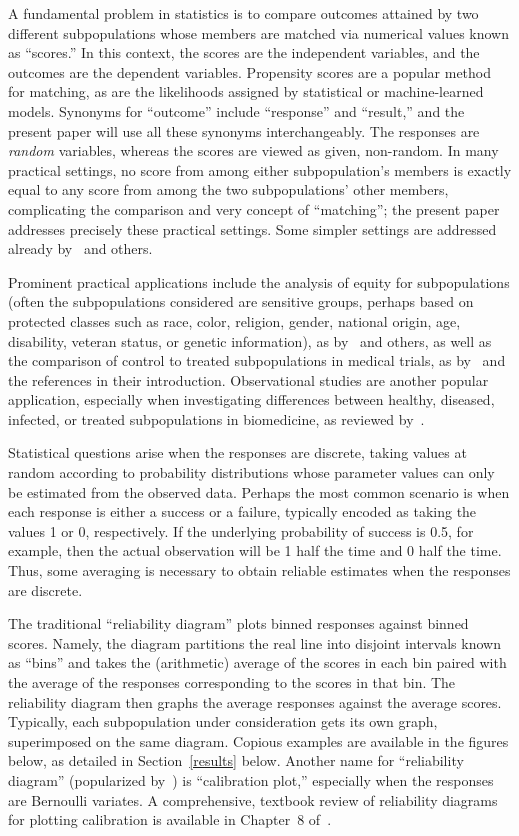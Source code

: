 \documentclass{article}
\begin{document}
A fundamental problem in statistics is to compare outcomes
attained by two different subpopulations whose members are matched
via numerical values known as ``scores.''
In this context, the scores are the independent variables,
and the outcomes are the dependent variables.
Propensity scores are a popular method for matching,
as are the likelihoods assigned by statistical or machine-learned models.
Synonyms for ``outcome'' include ``response'' and ``result,''
and the present paper will use all these synonyms interchangeably.
The responses are {\it random} variables,
whereas the scores are viewed as given, non-random.
In many practical settings, no score from among either subpopulation's members
is exactly equal to any score from among the two subpopulations' other members,
complicating the comparison and very concept of ``matching'';
the present paper addresses precisely these practical settings.
Some simpler settings are addressed already by~\cite{tygert} and others.

Prominent practical applications include the analysis of equity
for subpopulations (often the subpopulations considered are sensitive groups,
perhaps based on protected classes such as race, color, religion, gender,
national origin, age, disability, veteran status, or genetic information),
as by~\cite{corbett-davies-pierson-feller-goel-huq} and others,
as well as the comparison of control to treated subpopulations
in medical trials, as by~\cite{xu-kalbfleisch} and the references
in their introduction. Observational studies are another popular application,
especially when investigating differences between healthy, diseased, infected,
or treated subpopulations in biomedicine,
as reviewed by~\cite{luo-gardiner-bradley}.

Statistical questions arise when the responses are discrete,
taking values at random according to probability distributions
whose parameter values can only be estimated from the observed data.
Perhaps the most common scenario is when each response is either a success
or a failure, typically encoded as taking the values 1 or 0, respectively.
If the underlying probability of success is 0.5, for example,
then the actual observation will be 1 half the time and 0 half the time.
Thus, some averaging is necessary to obtain reliable estimates
when the responses are discrete.

The traditional ``reliability diagram'' plots binned responses
against binned scores. Namely, the diagram partitions the real line
into disjoint intervals known as ``bins'' and takes the (arithmetic) average
of the scores in each bin paired with the average
of the responses corresponding to the scores in that bin.
The reliability diagram then graphs the average responses
against the average scores.
Typically, each subpopulation under consideration gets its own graph,
superimposed on the same diagram.
Copious examples are available in the figures below,
as detailed in Section~\ref{results} below.
Another name for ``reliability diagram''
(popularized by~\cite{corbett-davies-pierson-feller-goel-huq})
is ``calibration plot,'' especially when the responses are Bernoulli variates.
A comprehensive, textbook review of reliability diagrams
for plotting calibration is available in Chapter~8 of~\cite{wilks}.
\end{document}
